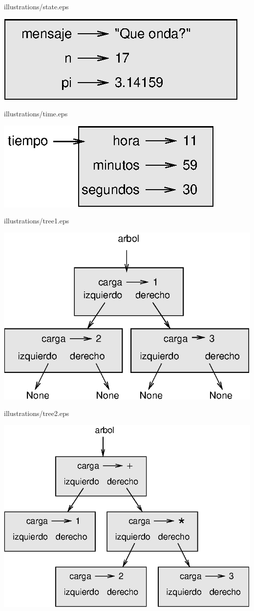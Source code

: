 illustrations/state.eps

\centerline{\includegraphics{illustrations/state.eps}}

illustrations/time.eps

\centerline{\includegraphics{illustrations/time.eps}}

illustrations/tree1.eps

\centerline{\includegraphics{illustrations/tree1.eps}}

illustrations/tree2.eps

\centerline{\includegraphics{illustrations/tree2.eps}}

